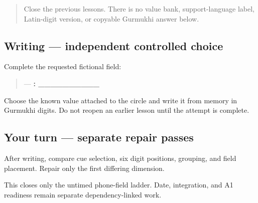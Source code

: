 \label{lesson:PA-W08-phone-no-model}



\begin{quote}
Close the previous lessons. There is no value bank, support-language label, Latin-digit version, or copyable Gurmukhi answer below.
\end{quote}

\subsection*{Writing — independent controlled choice}
Complete the requested fictional field:

\begin{quote}
 — \textbf{: \_\_\_\_\_\_\_\_\_\_}
\end{quote}

Choose the known value attached to the circle and write it from memory in Gurmukhi digits. Do not reopen an earlier lesson until the attempt is complete.

\subsection*{Your turn — separate repair passes}
After writing, compare cue selection, six digit positions, grouping, and field placement. Repair only the first differing dimension.

\begin{tcolorbox}[breakable,colback=teal!4,colframe=teal!35!black,title={Before you move on}]
This closes only the untimed phone-field ladder. Date, integration, and A1 readiness remain separate dependency-linked work.
\end{tcolorbox}
